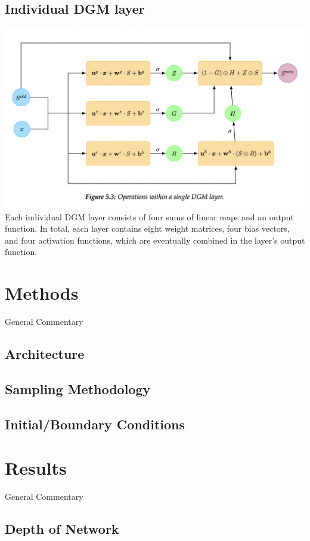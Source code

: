 \documentclass{article}
\begin{document}
\subsection{ Individual DGM layer }
\includegraphics[scale=0.32]{DGM_Layer.png}\\
Each individual DGM layer consists of four sums of linear maps and an output function. In total, each layer contains eight weight matrices, four bias vectors, and four activation functions, which are eventually combined in the layer's output function.

\section{Methods}

General Commentary

\subsection{Architecture}

\subsection{Sampling Methodology}

\subsection{Initial/Boundary Conditions}

\section{Results}

General Commentary

\subsection{Depth of Network}
\end{document}
